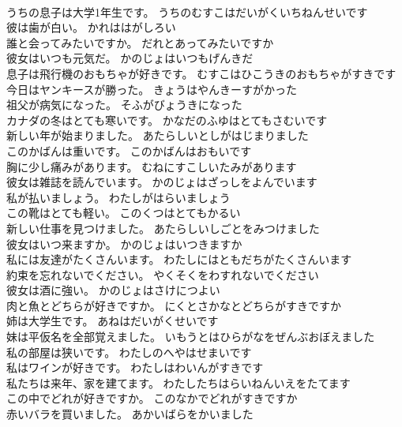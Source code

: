 \documentclass[8pt]{extreport}
\begin{document}
\begin{CJK}{UTF8}{min}
\\	うちの息子は大学1年生です。	うちのむすこはだいがくいちねんせいです 
\\	彼は歯が白い。	かれははがしろい 
\\	誰と会ってみたいですか。	だれとあってみたいですか 
\\	彼女はいつも元気だ。	かのじょはいつもげんきだ 
\\	息子は飛行機のおもちゃが好きです。	むすこはひこうきのおもちゃがすきです 
\\	今日はヤンキースが勝った。	きょうはやんきーすがかった 
\\	祖父が病気になった。	そふがびょうきになった 
\\	カナダの冬はとても寒いです。	かなだのふゆはとてもさむいです 
\\	新しい年が始まりました。	あたらしいとしがはじまりました 
\\	このかばんは重いです。	このかばんはおもいです 
\\	胸に少し痛みがあります。	むねにすこしいたみがあります 
\\	彼女は雑誌を読んでいます。	かのじょはざっしをよんでいます 
\\	私が払いましょう。	わたしがはらいましょう 
\\	この靴はとても軽い。	このくつはとてもかるい 
\\	新しい仕事を見つけました。	あたらしいしごとをみつけました 
\\	彼女はいつ来ますか。	かのじょはいつきますか 
\\	私には友達がたくさんいます。	わたしにはともだちがたくさんいます 
\\	約束を忘れないでください。	やくそくをわすれないでください 
\\	彼女は酒に強い。	かのじょはさけにつよい 
\\	肉と魚とどちらが好きですか。	にくとさかなとどちらがすきですか 
\\	姉は大学生です。	あねはだいがくせいです 
\\	妹は平仮名を全部覚えました。	いもうとはひらがなをぜんぶおぼえました 
\\	私の部屋は狭いです。	わたしのへやはせまいです 
\\	私はワインが好きです。	わたしはわいんがすきです 
\\	私たちは来年、家を建てます。	わたしたちはらいねんいえをたてます 
\\	この中でどれが好きですか。	このなかでどれがすきですか 
\\	赤いバラを買いました。	あかいばらをかいました 

\end{CJK}
\end{document}

